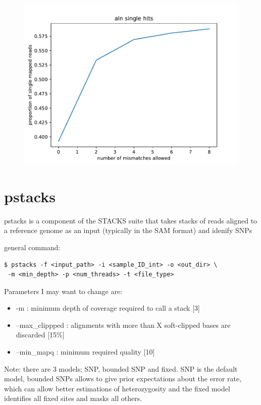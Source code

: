 \documentclass[10pt,a4paper]{report}
\begin{document}
\begin{figure}[h]
\includegraphics[scale=0.5]{mapstats}
\end{figure}

\section{pstacks}

pstacks is a component of the STACKS suite that takes stacks of reads aligned to a reference genome as an input (typically in the SAM format) and idenify SNPs

general command: 
\begin{lstlisting}
$ pstacks -f <input_path> -i <sample_ID_int> -o <out_dir> \
 -m <min_depth> -p <num_threads> -t <file_type>
\end{lstlisting}

Parameters I may want to change are: 
\begin{itemize}
\item -m : minimum depth of coverage required to call a stack [3]
\item --max\_clippped : alignments with more than X soft-clipped bases are discarded [15\%]
\item --min\_mapq : minimum required quality [10]
\end{itemize}

Note: there are 3 models; SNP, bounded SNP and fixed. SNP is the default model, bounded SNPs allows to give prior expectations about the error rate, which can allow better estimations of heterozygosity and the fixed model identifies all fixed sites and masks all others.
\end{document}
